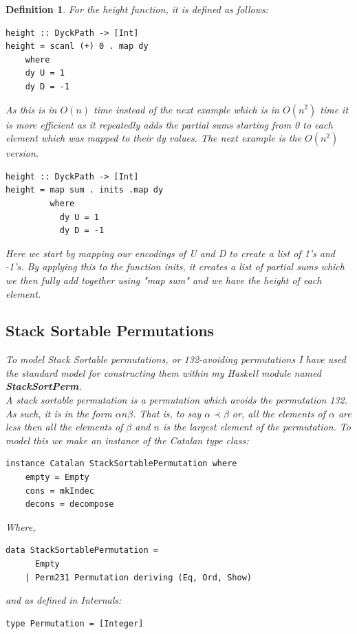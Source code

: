 \documentclass[12pt]{article}
\newtheorem{definition}{Definition}
\begin{document}
\begin{definition}
For the height function, it is defined as follows:
\begin{lstlisting}
height :: DyckPath -> [Int]
height = scanl (+) 0 . map dy
	where 
	dy U = 1
	dy D = -1
\end{lstlisting}
As this is in $O(n)$ time instead of the next example which is in $O(n^2)$ time it is more efficient as it repeatedly adds the partial sums starting from 0 to each element which was mapped to their dy values. The next example is the $O(n^2)$ version.
\begin{lstlisting}
height :: DyckPath -> [Int]
height = map sum . inits .map dy
         where
           dy U = 1
           dy D = -1
\end{lstlisting}
Here we start by mapping our encodings of U and D to create a list of 1's and -1's. By applying this to the function inits, it creates a list of partial sums which we then fully add together using "map sum" and we have the height of each element.\\

\subsection{Stack Sortable Permutations}
To model Stack Sortable permutations, or 132-avoiding permutations I have used the standard model for constructing them within my Haskell module named {\bf StackSortPerm}.\\
A stack sortable permutation is a permutation which avoids the permutation 132. As such, it is in the form $\alpha n \beta$. That is, to say $\alpha \prec \beta$ or, all the elements of $\alpha$ are less then all the elements of $\beta$ and $n$ is the largest element of the permutation. To model this we make an instance of the Catalan type class:
\begin{lstlisting}
instance Catalan StackSortablePermutation where
	empty = Empty	
	cons = mkIndec
	decons = decompose
\end{lstlisting}
Where, 
\begin{lstlisting}
data StackSortablePermutation = 
  	  Empty 
	| Perm231 Permutation deriving (Eq, Ord, Show)
\end{lstlisting}
and as defined in Internals:
\begin{lstlisting}
type Permutation = [Integer]
\end{lstlisting}


\end{definition}
\end{document}
